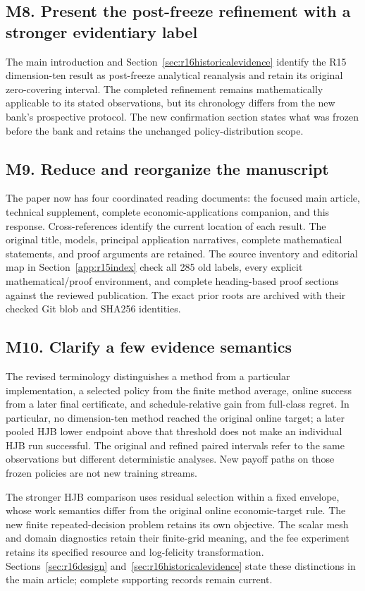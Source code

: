 \subsection*{M8. Present the post-freeze refinement with a stronger evidentiary label}\label{resp:M8}
The main introduction and Section~\ref{sec:r16historicalevidence} identify the R15 dimension-ten result as post-freeze analytical reanalysis and retain its original zero-covering interval. The completed refinement remains mathematically applicable to its stated observations, but its chronology differs from the new bank's prospective protocol. The new confirmation section states what was frozen before the bank and retains the unchanged policy-distribution scope.

\subsection*{M9. Reduce and reorganize the manuscript}\label{resp:M9}
The paper now has four coordinated reading documents: the focused main article, technical supplement, complete economic-applications companion, and this response. Cross-references identify the current location of each result. The original title, models, principal application narratives, complete mathematical statements, and proof arguments are retained. The source inventory and editorial map in Section~\ref{app:r15index} check all 285 old labels, every explicit mathematical/proof environment, and complete heading-based proof sections against the reviewed publication. The exact prior roots are archived with their checked Git blob and SHA256 identities.

\subsection*{M10. Clarify a few evidence semantics}\label{resp:M10}
The revised terminology distinguishes a method from a particular implementation, a selected policy from the finite method average, online success from a later final certificate, and schedule-relative gain from full-class regret. In particular, no dimension-ten method reached the original online target; a later pooled HJB lower endpoint above that threshold does not make an individual HJB run successful. The original and refined paired intervals refer to the same observations but different deterministic analyses. New payoff paths on those frozen policies are not new training streams.

The stronger HJB comparison uses residual selection within a fixed envelope, whose work semantics differ from the original online economic-target rule. The new finite repeated-decision problem retains its own objective. The scalar mesh and domain diagnostics retain their finite-grid meaning, and the fee experiment retains its specified resource and log-felicity transformation. Sections~\ref{sec:r16design} and~\ref{sec:r16historicalevidence} state these distinctions in the main article; complete supporting records remain current.
